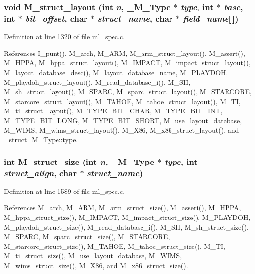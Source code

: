 \subsubsection{\setlength{\rightskip}{0pt plus 5cm}void M\_\-struct\_\-layout (int {\em n}, \bf{\_\-M\_\-Type} $\ast$ {\em type}, int $\ast$ {\em base}, int $\ast$ {\em bit\_\-offset}, char $\ast$ {\em struct\_\-name}, char $\ast$ {\em field\_\-name}[$\,$])}\label{m__spec_8h_ed813e7d3b3de9b8b73f5951e8d49c3b}




Definition at line 1320 of file ml\_\-spec.c.

References I\_\-punt(), M\_\-arch, M\_\-ARM, M\_\-arm\_\-struct\_\-layout(), M\_\-assert(), M\_\-HPPA, M\_\-hppa\_\-struct\_\-layout(), M\_\-IMPACT, M\_\-impact\_\-struct\_\-layout(), M\_\-layout\_\-database\_\-desc(), M\_\-layout\_\-database\_\-name, M\_\-PLAYDOH, M\_\-playdoh\_\-struct\_\-layout(), M\_\-read\_\-database\_\-i(), M\_\-SH, M\_\-sh\_\-struct\_\-layout(), M\_\-SPARC, M\_\-sparc\_\-struct\_\-layout(), M\_\-STARCORE, M\_\-starcore\_\-struct\_\-layout(), M\_\-TAHOE, M\_\-tahoe\_\-struct\_\-layout(), M\_\-TI, M\_\-ti\_\-struct\_\-layout(), M\_\-TYPE\_\-BIT\_\-CHAR, M\_\-TYPE\_\-BIT\_\-INT, M\_\-TYPE\_\-BIT\_\-LONG, M\_\-TYPE\_\-BIT\_\-SHORT, M\_\-use\_\-layout\_\-database, M\_\-WIMS, M\_\-wims\_\-struct\_\-layout(), M\_\-X86, M\_\-x86\_\-struct\_\-layout(), and \_\-struct\_\-M\_\-Type::type.
\subsubsection{\setlength{\rightskip}{0pt plus 5cm}int M\_\-struct\_\-size (int {\em n}, \bf{\_\-M\_\-Type} $\ast$ {\em type}, int {\em struct\_\-align}, char $\ast$ {\em struct\_\-name})}\label{m__spec_8h_276162b8c535a14dcf76d040d4bbcb5b}




Definition at line 1589 of file ml\_\-spec.c.

References M\_\-arch, M\_\-ARM, M\_\-arm\_\-struct\_\-size(), M\_\-assert(), M\_\-HPPA, M\_\-hppa\_\-struct\_\-size(), M\_\-IMPACT, M\_\-impact\_\-struct\_\-size(), M\_\-PLAYDOH, M\_\-playdoh\_\-struct\_\-size(), M\_\-read\_\-database\_\-i(), M\_\-SH, M\_\-sh\_\-struct\_\-size(), M\_\-SPARC, M\_\-sparc\_\-struct\_\-size(), M\_\-STARCORE, M\_\-starcore\_\-struct\_\-size(), M\_\-TAHOE, M\_\-tahoe\_\-struct\_\-size(), M\_\-TI, M\_\-ti\_\-struct\_\-size(), M\_\-use\_\-layout\_\-database, M\_\-WIMS, M\_\-wims\_\-struct\_\-size(), M\_\-X86, and M\_\-x86\_\-struct\_\-size().
